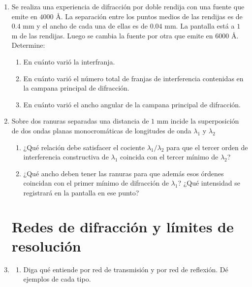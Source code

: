 \documentclass[11pt,spanish]{article}
\begin{document}
\begin{enumerate}

    \item Se realiza una experiencia de difracción por doble rendija con una
    fuente que emite en $4000$ Å. La separación entre los puntos medios
    de las rendijas es de $0.4$ mm y el ancho de cada una de ellas es
    de $0.04$ mm. La pantalla está a $1$ m de las rendijas. Luego se cambia
    la fuente por otra que emite en $6000$ Å. Determine:

    \begin{enumerate}
        \item En cuánto varió la interfranja.

        \item En cuánto varió el número total de franjas de interferencia contenidas
        en la campana principal de difracción.

        \item En cuánto varió el ancho angular de la campana principal de difracción.
    \end{enumerate}

    
    \item Sobre dos ranuras separadas una distancia de $1$ mm incide la superposición
    de dos ondas planas monocromáticas de longitudes de onda $\lambda_{1}$
    y $\lambda_{2}$

    \begin{enumerate}
        \item ¿Qué relación debe satisfacer el cociente $\lambda_{1}/\lambda_{2}$
        para que el tercer orden de interferencia constructiva de $\lambda_{1}$
        coincida con el tercer mínimo de $\lambda_{2}$?

        \item ¿Qué ancho deben tener las ranuras para que además esos órdenes
        coincidan con el primer mínimo de difracción de $\lambda_{1}$? ¿Qué
        intensidad se registrará en la pantalla en ese punto?
    \end{enumerate}


\section*{Redes de difracción y límites de resolución}


    \item 
    
    \begin{enumerate}
        \item Diga qué entiende por red de transmisión y por red de reflexión.
        Dé ejemplos de cada tipo.


\end{enumerate}
\end{enumerate}
\end{document}
